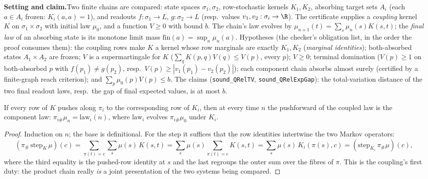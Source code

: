 

\textbf{Setting and claim.}\enspace Two finite chains are compared:
state spaces $\sigma_1, \sigma_2$, row-stochastic kernels $K_1, K_2$,
absorbing target sets $A_i$ (each $a \in A_i$ frozen: $K_i(a, a) = 1$),
and readouts $f : \sigma_1 \to L$, $g : \sigma_2 \to L$ (resp.\ values
$v_1, v_2 : \sigma_i \to \R$). The certificate supplies a
\emph{coupling} kernel $K$ on $\sigma_1 \times \sigma_2$ with initial
law $\mu_0$, and a function $V \geq 0$ with bound $b$. The chain's law
evolves by $\mu_{n+1}(t) = \sum_s \mu_n(s) K(s, t)$; the \emph{final
law} of an absorbing state is its monotone limit mass
$\mathrm{fin}(a) = \sup_n \mu_n(a)$. Hypotheses (the checker's
obligation list, in the order the proof consumes them): the coupling
rows make $K$ a kernel whose row marginals are exactly $K_1, K_2$
(\emph{marginal identities}); both-absorbed states
$A_1 \times A_2$ are frozen; $V$ is a supermartingale for $K$
($\sum_q K(p, q) V(q) \leq V(p)$, every $p$); $V \geq 0$; terminal
domination ($V(p) \geq 1$ on both-absorbed $p$ with
$f(p_1) \neq g(p_2)$, resp.\ $V(p) \geq |v_1(p_1) - v_2(p_2)|$); each
component chain absorbs almost surely (certified by a finite-graph
reach criterion); and $\sum_p \mu_0(p) V(p) \leq b$. The claims
(\texttt{sound\_QRelTV}, \texttt{sound\_QRelExpGap}): the
total-variation distance of the two final readout laws, resp.\ the gap
of final expected values, is at most $b$.

\begin{blemma}\label{lem:qcd-marginal}
If every row of $K$ pushes along $\pi_i$ to the corresponding row of
$K_i$, then at every time $n$ the pushforward of the coupled law is the
component law: $\pi_{i\#}\mu_n = \mathrm{law}_i(n)$, where
$\mathrm{law}_i$ evolves $\pi_{i\#}\mu_0$ under $K_i$.
\end{blemma}
\begin{proof}
Induction on $n$; the base is definitional. For the step it suffices
that the row identities intertwine the two Markov operators:
\[
(\pi_{\#}\,\mathrm{step}_K\,\mu)(c)
= \sum_{\pi(t) = c} \sum_{s} \mu(s)\, K(s, t)
= \sum_{s} \mu(s) \sum_{\pi(t) = c} K(s, t)
= \sum_{s} \mu(s)\, K_i(\pi(s), c)
= (\mathrm{step}_{K_i}\, \pi_{\#}\mu)(c),
\]
where the third equality is the pushed-row identity at $s$ and the last
regroups the outer sum over the fibres of $\pi$. This is the coupling's
first duty: the product chain really \emph{is} a joint presentation of
the two systems being compared.
\end{proof}

